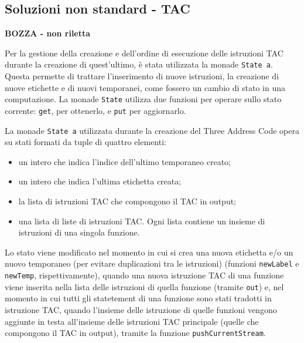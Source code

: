 \subsection{Soluzioni non standard - TAC}
\begin{center}
    {\bf BOZZA - non riletta}
\end{center}

Per la gestione della creazione e dell'ordine di esecuzione delle istruzioni TAC durante la creazione di quest'ultimo, è stata utilizzata la monade {\tt State a}. Questa permette di trattare l'inserimento di nuove istruzioni, la creazione di nuove etichette e di nuovi temporanei, come fossero un cambio di stato in una computazione. La monade {\tt State} utilizza due funzioni per operare sullo stato corrente: {\tt get}, per ottenerlo, e {\tt put} per aggiornarlo. 

La monade {\tt State a} utilizzata durante la creazione del Three Address Code opera su stati formati da tuple di quattro elementi:
\begin{itemize}
    \item un intero che indica l'indice dell'ultimo temporaneo creato;
    \item un intero che indica l'ultima etichetta creata;
    \item la lista di istruzioni TAC che compongono il TAC in output;
    \item una lista di liste di istruzioni TAC. Ogni lista contiene un insieme di istruzioni di una singola funzione. 
\end{itemize}

Lo stato viene modificato nel momento in cui si crea una nuova etichetta e/o un nuovo temporaneo (per evitare duplicazioni tra le istruzioni) (funzioni {\tt newLabel} e {\tt newTemp}, rispettivamente), quando una nuova istruzione TAC di una funzione viene inserita nella lista delle istruzioni di quella funzione (tramite {\tt out}) e, nel momento in cui tutti gli statetement di una funzione sono stati tradotti in istruzione TAC, quando l'insieme delle istruzione di quelle funzioni vengono aggiunte in testa all'insieme delle istruzioni TAC principale (quelle che compongono il TAC in output), tramite la funzione {\tt pushCurrentStream}.